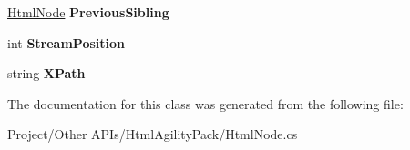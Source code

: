\begin{DoxyCompactItemize}
\item 
\mbox{\label{class_html_agility_pack_1_1_html_node_a8841f064bc5b00751c48a04aa761678d}} 
\hyperlink{class_html_agility_pack_1_1_html_node}{Html\+Node} {\bfseries Previous\+Sibling}
\item 
\mbox{\label{class_html_agility_pack_1_1_html_node_aa6ae06ace7dbc9d61f94c6a501810ac0}} 
int {\bfseries Stream\+Position}
\item 
\mbox{\label{class_html_agility_pack_1_1_html_node_a689dc36bee07f9c1f265e45daa19c13c}} 
string {\bfseries X\+Path}
\end{DoxyCompactItemize}


The documentation for this class was generated from the following file\+:\begin{DoxyCompactItemize}
\item 
Project/\+Other A\+P\+Is/\+Html\+Agility\+Pack/Html\+Node.\+cs\end{DoxyCompactItemize}
